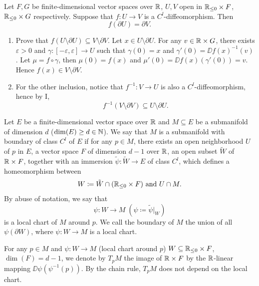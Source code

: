 \begin{corollaryenv}\label{cor:7.7.6}
    Let $F,G$ be finite-dimensional vector spaces over $\mathbb{R}$,
    $U,V$ open in $\mathbb{R}_{\le 0} \times F$, $\mathbb{R}_{\le 0} \times G$ respectively.
    Suppose that $f : U \longrightarrow V$ is a $C^l$-diffeomorphism.
    Then
    $$f(\partial U) = \partial V.$$
\end{corollaryenv}
\begin{proofenv}
    \quad
    \begin{enumerate}[label=\Roman*.]
        \item Prove that $f(U \setminus \partial U) \subseteq V \setminus \partial V$.
            Let $x \in U \setminus \partial U$.
            For any $v \in \mathbb{R} \times G$, there exists $\varepsilon > 0$ and $\gamma : [-\varepsilon, \varepsilon] \longrightarrow U$ such that $\gamma(0) = x$ and $\gamma'(0) = \DD f(x)^{-1} (v)$.
            Let $\mu = f \circ \gamma$, then $\mu(0) = f(x)$ and $\mu'(0) = \DD f (x) (\gamma'(0)) = v$.
            Hence $f(x) \in V \setminus \partial V$.
        \item For the other inclusion, notice that $f^{-1}: V \longrightarrow U$ is also a $C^l$-diffeomorphism, hence by I,
            $$f^{-1}(V \setminus \partial V) \subseteq U \setminus \partial U.$$
    \end{enumerate}
\end{proofenv}

\begin{definitionenv}
    Let $E$ be a finite-dimensional vector space over $\mathbb{R}$ and $M \subseteq E$ be a submanifold of dimension $d$ ($\dim(E) \ge d \in \mathbb{N}$).
    We say that $M$ is a submanifold with boundary of class $C^l$ of $E$ if for any $p \in M$, there exists an open neighborhood $U$ of $p$ in $E$, a vector space $F$ of dimension $d - 1$ over $\mathbb{R}$, an open subset $\tilde{W}$ of $\mathbb{R} \times F$, together with an immersion $\tilde{\psi} : \tilde{W} \longrightarrow E$ of class $C^l$,
    which defines a homeomorphism between
    $$W \coloneq \tilde{W} \cap (\mathbb{R}_{\le 0} \times F) \text{ and } U \cap M.$$
    By abuse of notation, we say that
    $$\psi : W \longrightarrow M \; (\psi \coloneq \tilde{\psi}|_{W})$$
    is a local chart of $M$ around $p$.
    We call the boundary of $M$ the union of all $\psi(\partial W)$, where $\psi : W \longrightarrow M$ is a local chart.

    \quad For any $p \in M$ and $\psi : W \longrightarrow M$ (local chart around $p$) $W \subseteq \mathbb{R}_{\le 0} \times F$, $\dim (F) = d - 1$, we denote by $T_p M$ the image of $\mathbb{R} \times F$ by the $\mathbb{R}$-linear mapping $\DD \psi (\psi^{-1}(p))$.
    By the chain rule, $T_p M$ does not depend on the local chart.
\end{definitionenv}

